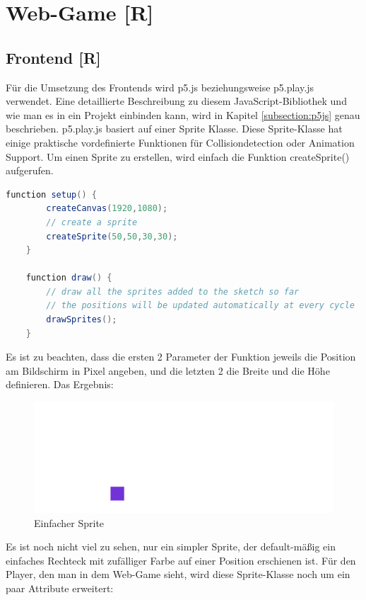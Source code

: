 \section{Web-Game [R]}
\subsection{Frontend [R]}
Für die Umsetzung des Frontends wird p5.js beziehungsweise p5.play.js verwendet. 
Eine detaillierte Beschreibung zu diesem JavaScript-Bibliothek und wie man es in ein Projekt einbinden kann, wird in Kapitel \ref{subsection:p5js} genau beschrieben.
p5.play.js basiert auf einer Sprite Klasse. Diese Sprite-Klasse hat einige praktische vordefinierte Funktionen für Collisiondetection oder Animation Support. 
Um einen Sprite zu erstellen, wird einfach die Funktion createSprite() aufgerufen.
\\
\begin{lstlisting}[language=Java,label=lst:impl:createSprite]
    function setup() {
        createCanvas(1920,1080);
        // create a sprite
        createSprite(50,50,30,30);
    }

    function draw() {
        // draw all the sprites added to the sketch so far
        // the positions will be updated automatically at every cycle
        drawSprites();
    }
\end{lstlisting}


Es ist zu beachten, dass die ersten 2 Parameter der Funktion jeweils die Position am Bildschirm in Pixel angeben, und die letzten 2 die Breite und die Höhe definieren.
Das Ergebnis:
\begin{figure}[H]
    \centering
    \includegraphics[scale=1]{pics/simpleSprite.PNG}
    \caption{Einfacher Sprite}
\end{figure}

Es ist noch nicht viel zu sehen, nur ein simpler Sprite, der default-mäßig ein einfaches Rechteck mit zufälliger Farbe auf einer Position erschienen ist.
Für den Player, den man in dem Web-Game sieht, wird diese Sprite-Klasse noch um ein paar Attribute erweitert:

